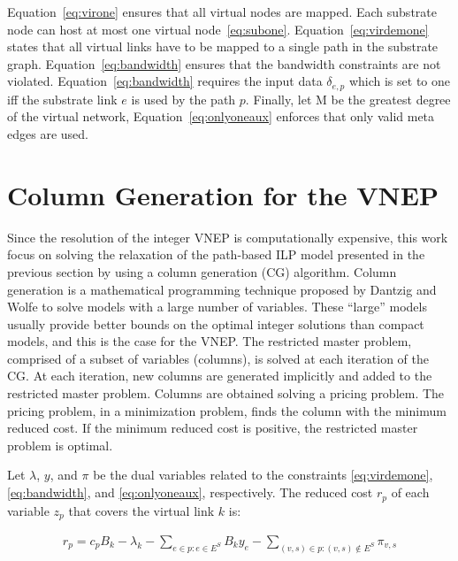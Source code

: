 \documentclass[conference]{IEEEtran}
\begin{document}
Equation~\eqref{eq:virone} ensures that all virtual nodes are mapped. Each substrate node can host at most one virtual node~\eqref{eq:subone}.
Equation~\eqref{eq:virdemone} states that all virtual links have to be mapped to a single path in the substrate graph. Equation~\eqref{eq:bandwidth} ensures that the bandwidth constraints are not violated.
Equation~\ref{eq:bandwidth} requires the input data $\delta_{e,p}$ which is set to one iff the substrate link $e$ is used by the path $p$.
Finally, let M be the greatest degree of the virtual network, Equation~\eqref{eq:onlyoneaux} enforces that only valid meta edges are used.



\section{Column Generation for the VNEP}
\label{sec:CG}

Since the resolution of the integer VNEP is computationally expensive, 
this work focus on solving the relaxation of the path-based ILP model presented in the previous section by using a column generation (CG) algorithm.
Column generation is a mathematical programming technique proposed by Dantzig and Wolfe \cite{Dantzig:1960} 
to solve models with a large number of variables.
These ``large'' models usually provide better bounds on the optimal integer solutions than compact models, and this is the case for the VNEP.
The restricted master problem, comprised of a subset of variables (columns), is solved at each iteration of the CG.
At each iteration, new columns are generated implicitly and added to the restricted master problem.
Columns are obtained solving a pricing problem.
The pricing problem, in a minimization problem, finds the column with the minimum reduced cost.
If the minimum reduced cost is positive, the restricted master problem is optimal.

Let $\lambda$, $y$, and  $\pi$ be the dual variables related to the constraints \eqref{eq:virdemone}, \eqref{eq:bandwidth}, and \eqref{eq:onlyoneaux}, respectively. The reduced cost $r_{p}$ of each variable $z_{p}$ that covers the virtual link $k$ is:

\begin{align}
  r_{p} = c_{p} B_{k} - \lambda_{k} - \sum\limits_{e \in p : e \in E^S} B_{k} y_{e}  - \sum\limits_{(v,s) \in p : (v,s) \notin E^S} \pi_{v,s}  \nonumber
\end{align}
\end{document}
